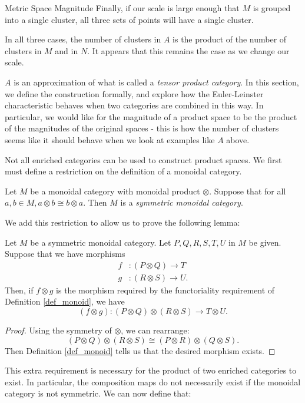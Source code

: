 \documentclass[12pt]{pom_thesis}
\begin{document}
\begin{chapter}{Metric Space Magnitude}
Finally, if our scale is large enough that $M$ is grouped into a single cluster, all three sets of points will have a single cluster.

In all three cases, the number of clusters in $A$ is the product of the number of clusters in $M$ and in $N$. It appears that this remains the case as we change our scale. 

$A$ is an approximation of what is called a \emph{tensor product category}. In this section, we define the construction formally, and explore how the Euler-Leinster characteristic behaves when two categories are combined in this way. In particular, we would like for the magnitude of a product space to be the product of the magnitudes of the original spaces - this is how the number of clusters seems like it should behave when we look at examples like $A$ above.

Not all enriched categories can be used to construct product spaces. We first must define a restriction on the definition of a monoidal category.

\begin{defn}
Let $M$ be a monoidal category with monoidal product $\otimes$. Suppose that for all $a,b \in M, a \otimes b \cong b \otimes a$. Then $M$ is a \emph{symmetric monoidal category}.
\end{defn}

We add this restriction to allow us to prove the following lemma:

\begin{lemma}
Let $M$ be a symmetric monoidal category. Let $P,Q,R,S,T,U$ in $M$ be given. Suppose that we have morphisms
\begin{align*}
f&:(P \otimes Q) \rightarrow T\\
g&:(R \otimes S) \rightarrow U.
\end{align*}
Then, if $f \otimes g$ is the morphism required by the functoriality requirement of Definition \ref{def_monoid}, we have
\[
(f \otimes g):(P \otimes Q) \otimes (R \otimes S) \rightarrow T \otimes U.
\]
\end{lemma}
\begin{proof}\label{prod_morph}
Using the symmetry of $\otimes$, we can rearrange:
\[
(P \otimes Q) \otimes (R \otimes S) \cong (P \otimes R) \otimes (Q \otimes S).
\]
Then Definition \ref{def_monoid} tells us that the desired morphism exists.
\end{proof}
This extra requirement is necessary for the product of two enriched categories to exist. In particular, the composition maps do not necessarily exist if the monoidal category is not symmetric. We can now define that:


\end{chapter}
\end{document}
